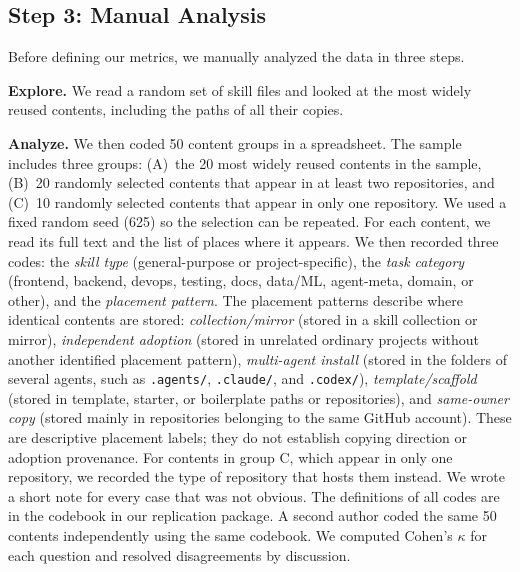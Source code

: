 \documentclass[sigconf,review]{acmart}
\begin{document}
\subsection{Step 3: Manual Analysis}
Before defining our metrics, we manually analyzed the data in three steps.
 
\textbf{Explore.} We read a random set of skill files and looked at the most widely reused contents, including the paths of all their copies.
 
\textbf{Analyze.} We then coded 50 content groups in a spreadsheet.
The sample includes three groups:
(A)~the 20 most widely reused contents in the sample,
(B)~20 randomly selected contents that appear in at least two repositories, and
(C)~10 randomly selected contents that appear in only one repository.
We used a fixed random seed (625) so the selection can be repeated.
For each content, we read its full text and the list of places where it appears.
We then recorded three codes:
the \emph{skill type} (general-purpose or project-specific),
the \emph{task category} (frontend, backend, devops, testing, docs, data/ML, agent-meta, domain, or other), and
the \emph{placement pattern}.
The placement patterns describe where identical contents are stored:
\emph{collection/mirror} (stored in a skill collection or mirror),
\emph{independent adoption} (stored in unrelated ordinary projects
without another identified placement pattern),
\emph{multi-agent install} (stored in the folders of several agents,
such as \texttt{.agents/}, \texttt{.claude/}, and \texttt{.codex/}),
\emph{template/scaffold} (stored in template, starter, or boilerplate
paths or repositories), and
\emph{same-owner copy} (stored mainly in repositories belonging to
the same GitHub account).
These are descriptive placement labels; they do not establish
copying direction or adoption provenance.
For contents in group C, which appear in only one repository, we recorded the type of repository that hosts them instead.
We wrote a short note for every case that was not obvious.
The definitions of all codes are in the codebook in our replication package. A second author coded the same 50 contents independently using the same codebook. We computed Cohen's $\kappa$ for each question and resolved disagreements by discussion.
 
\end{document}
